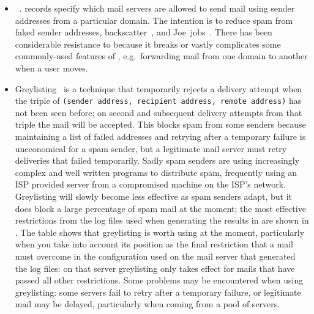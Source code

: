 \begin{itemize}

    \item {}~\cite{openspf}.  \label{spf
        introduction} records specify which mail servers are allowed to
        send mail using sender addresses from a particular domain.  The
        intention is to reduce spam from faked sender addresses,
        backscatter~\cite{postfix-backscatter}, and
        Joe~jobs~.  There has been considerable resistance
        to  because it breaks or vastly complicates some
        commonly-used features of , e.g.\ forwarding mail
        from one domain to another when a user moves.

    \item Greylisting~\cite{greylisting} is a technique that temporarily
        rejects a delivery attempt when the triple of \newline{}
        \tab{}\texttt{(sender address, recipient address, remote
         address)}\newline{} has not been seen before; on
        second and subsequent delivery attempts from that triple the mail
        will be accepted.  This blocks spam from some senders because
        maintaining a list of failed addresses and retrying after a
        temporary failure is uneconomical for a spam sender, but a
        legitimate mail server must retry deliveries that failed
        temporarily.  Sadly spam senders are using increasingly complex and
        well written programs to distribute spam, frequently using an ISP
        provided  server from a compromised machine on the
        ISP's network.  Greylisting will slowly become less effective as
        spam senders adapt, but it does block a large percentage of spam
        mail at the moment; the most effective restrictions from the
        \numberOFlogFILES{} log files used when generating the results in
         are shown in .
        The table shows that greylisting is worth using at the moment,
        particularly when you take into account its position as the final
        restriction that a mail must overcome in the configuration used on
        the mail server that generated the log files: on that server
        greylisting only takes effect for mails that have passed all other
        restrictions.  Some problems may be encountered when using
        greylisting: some servers fail to retry after a temporary failure,
        or legitimate mail may be delayed, particularly when coming from a
        pool of servers.


\end{itemize}
